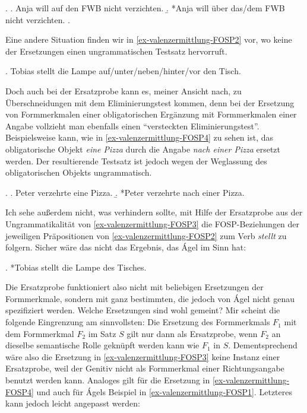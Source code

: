 \ex. \label{ex-valenzermittlung-FOSP1}
\a. Anja will auf den FWB nicht verzichten.
\b. *Anja will über das/dem FWB nicht verzichten.
\z. \citep[179]{Agel:00}

Eine andere Situation finden wir in \ref{ex-valenzermittlung-FOSP2} vor, wo keine der Ersetzungen einen ungrammatischen Testsatz hervorruft.

\ex. \label{ex-valenzermittlung-FOSP2} Tobias stellt die Lampe auf/unter/neben/hinter/vor den Tisch. \\ \citep[180]{Agel:00}

Doch auch bei der Ersatzprobe kann es, meiner Ansicht nach, zu Überschneidungen mit dem Eliminierungstest kommen, denn bei der Ersetzung von Formmerkmalen einer obligatorischen Ergänzung mit Formmerkmalen einer Angabe vollzieht man ebenfalls einen "`versteckten Eliminierungstest"'. Beispielsweise kann, wie in \ref{ex-valenzermittlung-FOSP4} zu sehen ist, das obligatorische Objekt {\it eine Pizza} durch die Angabe {\it nach einer Pizza} ersetzt werden. Der resultierende Testsatz ist jedoch wegen der Weglassung des obligatorischen Objekts ungrammatisch. 

\ex. \label{ex-valenzermittlung-FOSP4}
\a. Peter verzehrte eine Pizza.
\b. *Peter verzehrte nach einer Pizza. 

Ich sehe au\ss erdem nicht, was verhindern sollte, mit Hilfe der Ersatzprobe aus der Ungrammatikalität von \ref{ex-valenzermittlung-FOSP3} die FOSP-Beziehungen der jeweiligen Präpositionen von \ref{ex-valenzermittlung-FOSP2} zum Verb {\it stellt} zu folgern. Sicher wäre das nicht das Ergebnis, das \'Agel im Sinn hat: 

\ex. *Tobias stellt die Lampe des Tisches.\label{ex-valenzermittlung-FOSP3}

Die Ersatzprobe funktioniert also nicht mit beliebigen Ersetzungen der Formmerkmale, sondern mit ganz bestimmten, die jedoch von \'Agel nicht genau spezifiziert werden. Welche Ersetzungen sind wohl gemeint? Mir scheint die folgende Eingrenzung am sinnvollsten: Die Ersetzung des Formmerkmals $F_1$ mit dem Formmerkmal $F_2$ im Satz $S$ gilt nur dann als Ersatzprobe, wenn $F_2$ an dieselbe semantische Rolle geknüpft werden kann wie $F_1$ in $S$. Dementsprechend wäre also die Ersetzung in \ref{ex-valenzermittlung-FOSP3} keine Instanz einer Ersatzprobe, weil der Genitiv nicht als Formmerkmal einer Richtungsangabe benutzt werden kann. Analoges gilt für die Ersetzung in \ref{ex-valenzermittlung-FOSP4} und auch für \'Agels Beispiel in \ref{ex-valenzermittlung-FOSP1}. Letzteres kann jedoch leicht angepasst werden:

